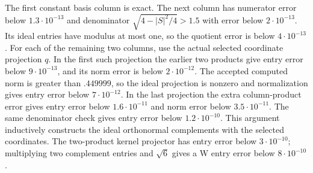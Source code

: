 The first constant basis column is exact.  The next column has
numerator error below $1.3\cdot10^{-13}$ and denominator
$\sqrt{4-|S|^2/4}>1.5$ with error below $2\cdot10^{-13}$.
Its ideal entries have modulus at most one, so the quotient error is
below $4\cdot10^{-13}$.  For each of the remaining two columns, use
the actual selected coordinate projection $q$.  In the first such
projection the earlier two products give entry error below
$9\cdot10^{-13}$, and its norm error is below $2\cdot10^{-12}$.
The accepted computed norm is greater than $.449999$, so the ideal
projection is nonzero and normalization gives entry error below
$7\cdot10^{-12}$.  In the last projection the extra column-product
error gives entry error below $1.6\cdot10^{-11}$ and norm error below
$3.5\cdot10^{-11}$.  The same denominator check gives entry error
below $1.2\cdot10^{-10}$.  This argument inductively constructs the
ideal orthonormal complements with the selected coordinates.
The two-product kernel projector has entry error below
$3\cdot10^{-10}$; multiplying two complement entries and $\sqrt6$
gives a W entry error below $8\cdot10^{-10}$.

